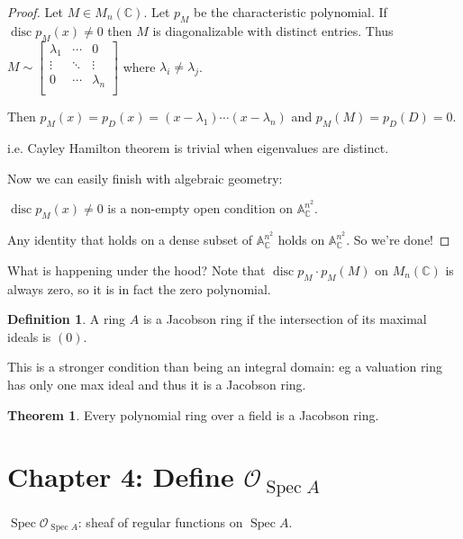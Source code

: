 \documentclass{article}
\theoremstyle{definition}
\newtheorem*{definition}{Definition}
\newtheorem{theorem}{Theorem}
\begin{document}
    \begin{proof}
        Let \(M \in M_n(\mathbb{C})\). Let \(p_M\) be the characteristic polynomial. If \(\operatorname{disc} p_M(x) \neq 0\) then \(M\) is diagonalizable with distinct entries. Thus \(M \sim \begin{bmatrix}
            \lambda_1 & \cdots & 0 \\
            \vdots & \ddots & \vdots \\
            0 & \cdots & \lambda_n \\
        \end{bmatrix} \) where \(\lambda_i \neq \lambda_j\).

        Then \(p_M(x) = p_D(x) = (x-\lambda_1) \cdots (x-\lambda_n)\) and \(p_M(M) = p_D(D) = 0\).
        
        i.e. Cayley Hamilton theorem is trivial when eigenvalues are distinct.

        Now we can easily finish with algebraic geometry:

        \(\operatorname{disc} p_M(x) \neq 0\) is a non-empty open condition on \(\mathbb{A}^{n^2}_{\mathbb{C}}\). 

        Any identity that holds on a dense subset of \(\mathbb{A}^{n^2}_{\mathbb{C}}\) holds on \(\mathbb{A}^{n^2}_{\mathbb{C}}\). So we're done! 
    \end{proof}

    What is happening under the hood? Note that \(\operatorname{disc} p_M \cdot p_M(M)\) on \(M_n(\mathbb{C})\) is always zero, so it is in fact the zero polynomial.

    \begin{definition}
        A ring \(A\) is a Jacobson ring if the intersection of its maximal ideals is \((0)\).
    \end{definition}

    This is a stronger condition than being an integral domain: eg a valuation ring has only one max ideal and thus it is a Jacobson ring.

    \begin{theorem}
        Every polynomial ring over a field is a Jacobson ring.
    \end{theorem}

    \section*{Chapter 4: Define \(\mathcal{O}_{\operatorname{Spec} A}\)}

    \(\operatorname{Spec} \mathcal{O}_{\operatorname{Spec} A}\): sheaf of regular functions on \(\operatorname{Spec} A\).
\end{document}
